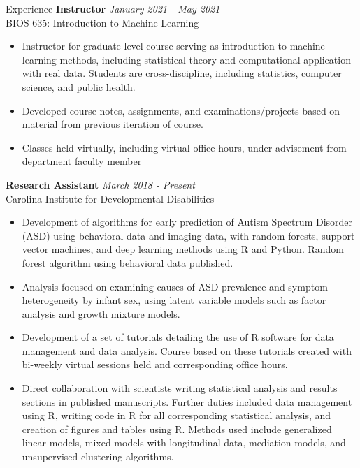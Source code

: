 \documentclass{resume} %
\begin{document}
\begin{rSection}{Experience}
{\bf Instructor} \hfill {\em January 2021 - May 2021} 
\\ BIOS 635: Introduction to Machine Learning
\begin{itemize}
    \item Instructor for graduate-level course serving as introduction to machine learning methods, including statistical theory and computational application with real data.  Students are cross-discipline, including statistics, computer science, and public health.
    \item Developed course notes, assignments, and examinations/projects based on material from previous iteration of course.
    \item Classes held virtually, including virtual office hours, under advisement from department faculty member
\end{itemize}
{\bf Research Assistant} \hfill {\em March 2018 - Present}
\\ Carolina Institute for Developmental Disabilities
\begin{itemize}
    \item Development of algorithms for early prediction of Autism Spectrum Disorder (ASD) using behavioral data and imaging data, with random forests, support vector machines, and deep learning methods using R and Python.  Random forest algorithm using behavioral data published.
    \item Analysis focused on examining causes of ASD prevalence and symptom heterogeneity by infant sex, using latent variable models such as factor analysis and growth mixture models.
    \item Development of a set of tutorials detailing the use of R software for data management and data analysis.  Course based on these tutorials created with bi-weekly virtual sessions held and corresponding office hours.
    \item Direct collaboration with scientists writing statistical analysis and results sections in published manuscripts.  Further duties included data management using R, writing code in R for all corresponding statistical analysis, and creation of figures and tables using R.  Methods used include generalized linear models, mixed models with longitudinal data, mediation models, and unsupervised clustering algorithms.

\end{itemize}
\end{rSection}
\end{document}
